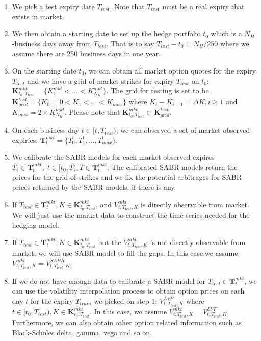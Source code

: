 \documentclass[letterpaper,12pt,titlepage,oneside,final]{book}
\numberwithin{equation}{section}
\theoremstyle{definition}
\newcommand{\Vmkt}{V^{mkt}}
\begin{document}
\begin{enumerate}
	\item We pick a  test expiry date $T_{test}$. Note that  $T_{test}$ must be a real expiry that exists in market. 
	\item We then obtain  a starting date to set up the hedge portfolio $t_0$ which is  a $N_H$-business days away from $T_{test}$. That is to say $T_{test}-t_0=N_H/250$ where we assume there are 250 business days in one year. 
	\item On the starting date $t_0$, we can obtain all market option quotes for the expiry  $T_{test}$ and we have a grid of market strikes for expiry $T_{test}$ on $t_0$:
	$\mathbf{K}^{mkt}_{t_0,T_{test}}=\{K^{mkt}_1<\dots<K^{mkt}_{N_K}\}$. The grid for testing is set to be $\mathbf{K}^{test}_{grid}=\{K_0=0<K_1<\dots<K_{max}\}$ where $K_i-K_{i-1}=\Delta K, i \geq 1$ and $K_{max}=2 \times K^{mkt}_{N_K}$. Please note that $\mathbf{K}^{mkt}_{t_0,T_{test}} \subset \mathbf{K}^{test}_{grid}$.  
	\item On each business day $t \in [t,T_{test})$, we can observed a set of market observed expiries: $\mathbf{T}_t^{mkt}=\{T_0^{t},T_1^{t},\dots,T_{max}^{t}\}$.
	\item  We calibrate the SABR models for each market observed expires $T_i^{t} \in \mathbf{T}_t^{mkt},	\;  t \in [t_0, T),T \in \mathbf{T}_t^{mkt}$. The calibrated SABR models return the prices  for the grid of strikes and we fix the potential arbitrages for SABR prices returned by the SABR models, if there is any. 
	\item If $T_{test} \in \mathbf{T}_t^{mkt}, K \in \mathbf{K}^{mkt}_{t_0,T_{test}}$,  and $\Vmkt_{t,T_{test},K}$ is directly observable from market. 
We will just use the market data to construct the time series needed for the hedging model. 
	\item If $T_{test} \in \mathbf{T}_t^{mkt}, K \in \mathbf{K}^{mkt}_{t_0,T_{test}}$ but  the 
$\Vmkt_{t,T_{test},K}$ is not directly observable from market, we will use SABR model to fill the gaps. In this case,we assume  $\Vmkt_{t,T_{test},K}=V^{SABR}_{t,T_{test},K}$.
\item
If  we do not have enough data to calibrate a SABR model for $T_{test} \in  \mathbf{T}_t^{mkt}$, we can use the  volatility interpolation process \cite{andreasen2010volatility} to obtain option prices on each day $t$ for the expiry $T_{train}$ we picked on step 1: $V^{LVF}_{t,T_{test},K}$ where $t \in [t_0, T_{test}), K \in \mathbf{K}^{mkt}_{t_0,T_{test}}$.  In this case, we assume $\Vmkt_{t,T_{test},K}=V^{LVF}_{t,T_{test},K}$. Furthermore, we can also obtain other option related information such as Black-Scholes delta, gamma, vega and so on.
\end{enumerate}
\end{document}
